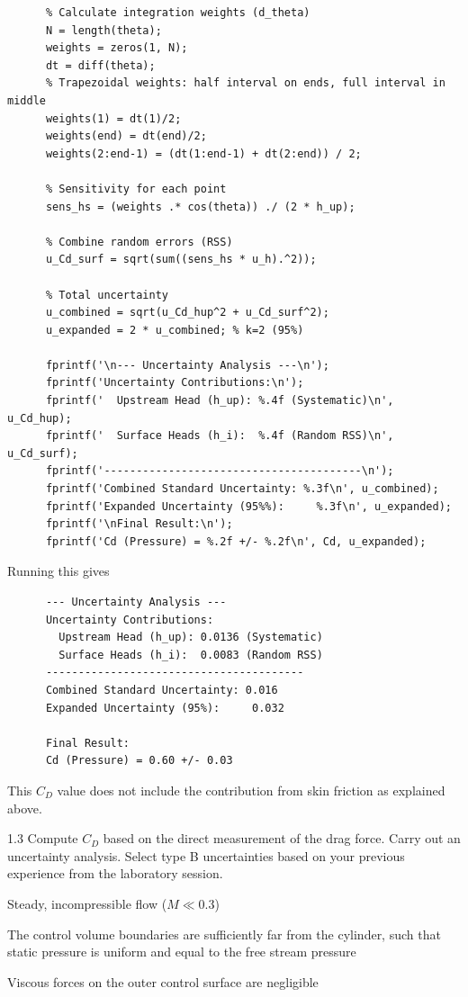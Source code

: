 \begin{derivation}
\begin{verbatim}
      % Calculate integration weights (d_theta)
      N = length(theta);
      weights = zeros(1, N);
      dt = diff(theta);
      % Trapezoidal weights: half interval on ends, full interval in middle
      weights(1) = dt(1)/2;
      weights(end) = dt(end)/2;
      weights(2:end-1) = (dt(1:end-1) + dt(2:end)) / 2;

      % Sensitivity for each point
      sens_hs = (weights .* cos(theta)) ./ (2 * h_up);

      % Combine random errors (RSS)
      u_Cd_surf = sqrt(sum((sens_hs * u_h).^2));

      % Total uncertainty
      u_combined = sqrt(u_Cd_hup^2 + u_Cd_surf^2);
      u_expanded = 2 * u_combined; % k=2 (95%)

      fprintf('\n--- Uncertainty Analysis ---\n');
      fprintf('Uncertainty Contributions:\n');
      fprintf('  Upstream Head (h_up): %.4f (Systematic)\n', u_Cd_hup);
      fprintf('  Surface Heads (h_i):  %.4f (Random RSS)\n', u_Cd_surf);
      fprintf('----------------------------------------\n');
      fprintf('Combined Standard Uncertainty: %.3f\n', u_combined);
      fprintf('Expanded Uncertainty (95%%):     %.3f\n', u_expanded);
      fprintf('\nFinal Result:\n');
      fprintf('Cd (Pressure) = %.2f +/- %.2f\n', Cd, u_expanded);
    \end{verbatim}
    Running this gives
    \begin{verbatim}
      --- Uncertainty Analysis ---
      Uncertainty Contributions:
        Upstream Head (h_up): 0.0136 (Systematic)
        Surface Heads (h_i):  0.0083 (Random RSS)
      ----------------------------------------
      Combined Standard Uncertainty: 0.016
      Expanded Uncertainty (95%):     0.032

      Final Result:
      Cd (Pressure) = 0.60 +/- 0.03
    \end{verbatim}
    This $C_D$ value does not include the contribution from skin friction as explained above.
  \end{derivation}


  \begin{problem}{1.3}
    Compute $C_D$ based on the direct measurement of the drag force. Carry out an uncertainty analysis. Select type B uncertainties based on your previous experience from the laboratory session.
  \end{problem}

  \begin{assumptions}
    \item Steady, incompressible flow ($M \ll \num{0,3}$)
    \item The control volume boundaries are sufficiently far from the cylinder, such that static pressure is uniform and equal to the free stream pressure
    \item Viscous forces on the outer control surface are negligible
  \end{assumptions}

